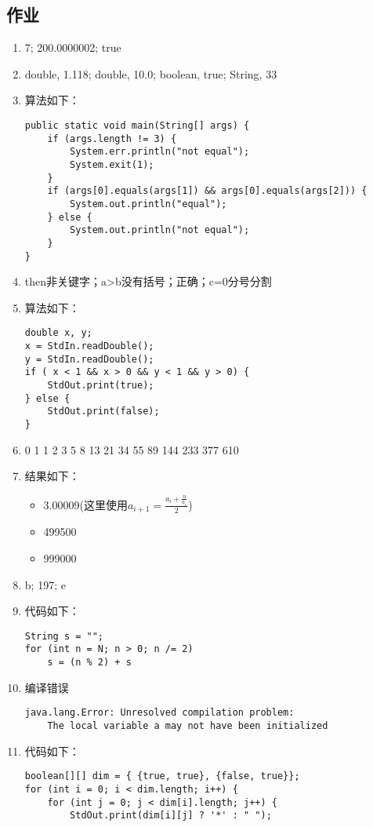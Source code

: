 \subsection{作业}
\begin{enumerate}
	\item 7; 200.0000002; true
	\item double, 1.118; double, 10.0; boolean, true; String, 33
	\item 算法如下：
	\begin{lstlisting}
public static void main(String[] args) {
	if (args.length != 3) {
		System.err.println("not equal");
		System.exit(1);
	}
	if (args[0].equals(args[1]) && args[0].equals(args[2])) {
		System.out.println("equal");
	} else {
		System.out.println("not equal");
	}
}
	\end{lstlisting}
	\item then非关键字；a>b没有括号；正确；c=0分号分割
	\item 算法如下：
	\begin{lstlisting}
double x, y;
x = StdIn.readDouble();
y = StdIn.readDouble();
if ( x < 1 && x > 0 && y < 1 && y > 0) {
	StdOut.print(true);
} else {
	StdOut.print(false);
}
	\end{lstlisting}
	\item 0 1 1 2 3 5 8 13 21 34 55 89 144 233 377 610 
	\item 结果如下：
	\begin{itemize}
		\item 3.00009(这里使用$a_{i+1} = \frac{a_i + \frac{n}{a_i}}{2}$)
		\item 499500
		\item 999000
	\end{itemize}
	\item b; 197; e
	\item 代码如下：
	\begin{lstlisting}
String s = "";
for (int n = N; n > 0; n /= 2)
	s = (n % 2) + s
	\end{lstlisting}
	\item 编译错误
	\begin{lstlisting}
java.lang.Error: Unresolved compilation problem: 
	The local variable a may not have been initialized
	\end{lstlisting}
	\item 代码如下：
	\begin{lstlisting}
boolean[][] dim = { {true, true}, {false, true}};
for (int i = 0; i < dim.length; i++) {
	for (int j = 0; j < dim[i].length; j++) {
		StdOut.print(dim[i][j] ? '*' : " ");

\end{lstlisting}
\end{enumerate}
